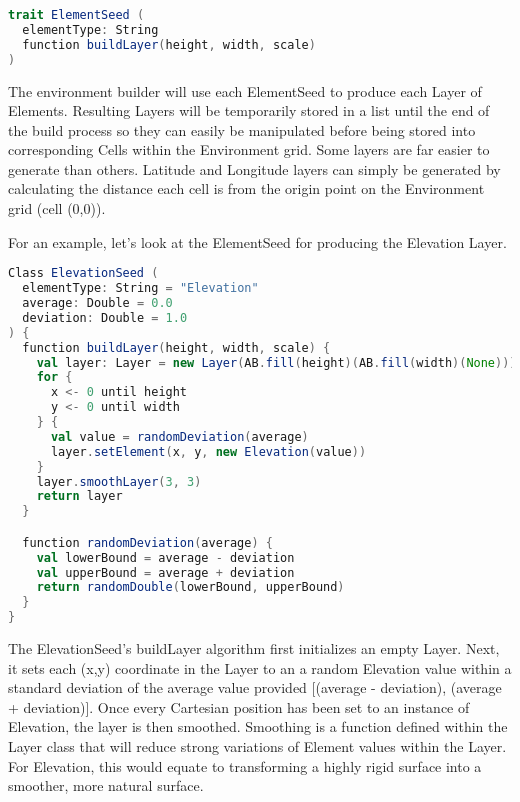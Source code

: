 \begin{lstlisting}[language=Scala]
trait ElementSeed (
  elementType: String
  function buildLayer(height, width, scale)
)
\end{lstlisting}

The environment builder will use each ElementSeed to produce each Layer of Elements.
Resulting Layers will be temporarily stored in a list until the end of the build process so they can easily be manipulated before being stored into corresponding Cells within the Environment grid.
Some layers are far easier to generate than others.
Latitude and Longitude layers can simply be generated by calculating the distance each cell is from the origin point on the Environment grid (cell (0,0)).

For an example, let’s look at the ElementSeed for producing the Elevation Layer.

\begin{lstlisting}[language=Scala]
Class ElevationSeed (
  elementType: String = "Elevation"
  average: Double = 0.0
  deviation: Double = 1.0
) {
  function buildLayer(height, width, scale) {
    val layer: Layer = new Layer(AB.fill(height)(AB.fill(width)(None)))
    for {
      x <- 0 until height
      y <- 0 until width
    } {
      val value = randomDeviation(average)
      layer.setElement(x, y, new Elevation(value))
    }
    layer.smoothLayer(3, 3)
    return layer
  }

  function randomDeviation(average) {
    val lowerBound = average - deviation
    val upperBound = average + deviation
    return randomDouble(lowerBound, upperBound)
  }
}
\end{lstlisting}


The ElevationSeed’s buildLayer algorithm first initializes an empty Layer.
Next, it sets each (x,y) coordinate in the Layer to an a random Elevation value within a standard deviation of the average value provided [(average - deviation), (average + deviation)].
Once every Cartesian position has been set to an instance of Elevation, the layer is then smoothed.
Smoothing is a function defined within the Layer class that will reduce strong variations of Element values within the Layer.
For Elevation, this would equate to transforming a highly rigid surface into a smoother, more natural surface.



